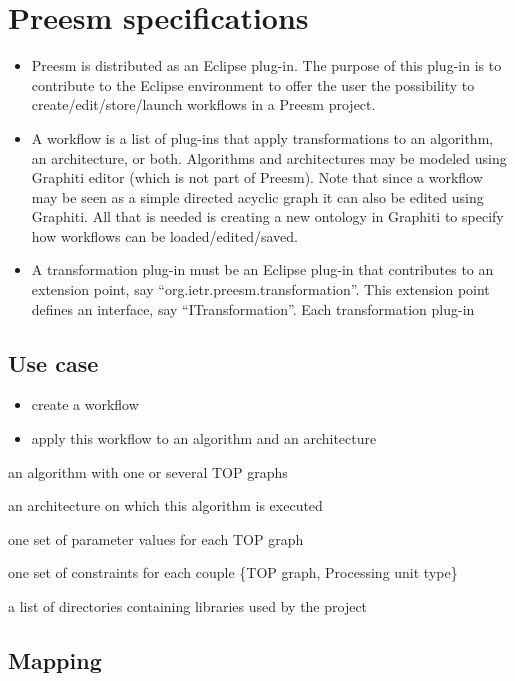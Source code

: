 \chapter{Preesm specifications}
\label{sec:specifs}

\begin{itemize}
\item Preesm is distributed as an Eclipse plug-in. The purpose of this plug-in is to contribute to the Eclipse environment to offer the user the possibility to create/edit/store/launch workflows in a Preesm project.
\item A workflow is a list of plug-ins that apply transformations to an algorithm, an architecture, or both. Algorithms and architectures may be modeled using Graphiti editor (which is not part of Preesm). Note that since a workflow may be seen as a simple directed acyclic graph it can also be edited using Graphiti. All that is needed is creating a new ontology in Graphiti to specify how workflows can be loaded/edited/saved.
\item A transformation plug-in must be an Eclipse plug-in that contributes to an extension point, say ``org.ietr.preesm.transformation''. This extension point defines an interface, say ``ITransformation''. Each transformation plug-in 
\end{itemize}

\section{Use case}

\begin{itemize}
	\item create a workflow
	\item apply this workflow to an algorithm and an architecture
\end{itemize}


\itemize
\item an algorithm with one or several TOP graphs 
\item an architecture on which this algorithm is executed
\item one set of parameter values for each TOP graph
\item one set of constraints for each couple \{TOP graph, Processing unit type\}
\item a list of directories containing libraries used by the project

\section{Mapping}

